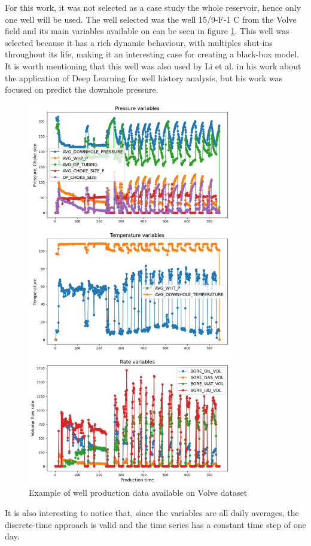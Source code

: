 \documentclass[conference]{IEEEtran}
\begin{document}
For this work, it was not selected as a case study the whole reservoir, hence only one well will be used. The well selected was the well 15/9-F-1 C from the Volve field and its main variables available on can be seen in figure \ref{example_well}. This well was selected because it has a rich dynamic behaviour, with multiples shut-ins throughout its life, making it an interesting case for creating a black-box model. It is worth mentioning that this well was also used by Li et al. \cite{Li2019} in his work about the application of Deep Learning for well history analysis, but his work was focused on predict the downhole pressure.

\begin{figure}[htbp]
\centerline{\includegraphics[width=3.5in]{data_example_2.png}}
\caption{Example of well production data available on Volve dataset}
\label{example_well}
\end{figure}

It is also interesting to notice that, since the variables are all daily averages, the discrete-time approach is valid and the time series has a constant time step of one day.
\end{document}
